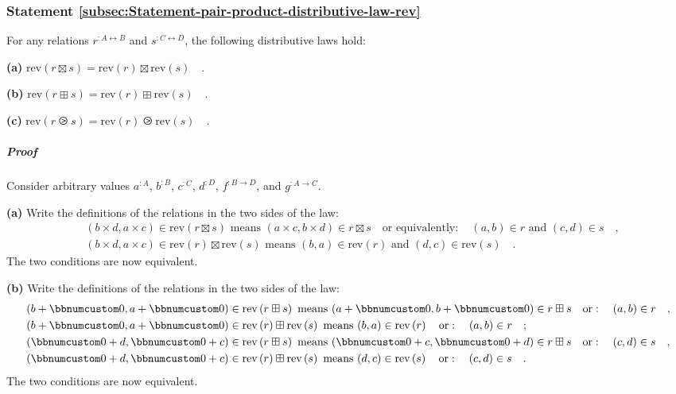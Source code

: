 \subsubsection{Statement \label{subsec:Statement-pair-product-distributive-law-rev}\ref{subsec:Statement-pair-product-distributive-law-rev}}

For any relations $r^{:A\leftrightarrow B}$ and $s^{:C\leftrightarrow D}$,
the following distributive laws hold:

\textbf{(a)} $\text{rev}\left(r\boxtimes s\right)=\text{rev}\left(r\right)\boxtimes\text{rev}\left(s\right)\quad$.

\textbf{(b)} $\text{rev}\left(r\boxplus s\right)=\text{rev}\left(r\right)\boxplus\text{rev}\left(s\right)\quad$.

\textbf{(c)} $\text{rev}\left(r\ogreaterthan s\right)=\text{rev}\left(r\right)\ogreaterthan\text{rev}\left(s\right)\quad$.

\subparagraph{Proof}

Consider arbitrary values $a^{:A}$, $b^{:B}$, $c^{:C}$, $d^{:D}$,
$f^{:B\rightarrow D}$, and $g^{:A\rightarrow C}$.

\textbf{(a)} Write the definitions of the relations in the two sides
of the law:
\begin{align*}
 & (b\times d,a\times c)\in\text{rev}\left(r\boxtimes s\right)\text{ means }(a\times c,b\times d)\in r\boxtimes s\quad\text{or equivalently}:\quad(a,b)\in r\text{ and }(c,d)\in s\quad,\\
 & (b\times d,a\times c)\in\text{rev}\left(r\right)\boxtimes\text{rev}\left(s\right)\text{ means }(b,a)\in\text{rev}\left(r\right)\text{ and }(d,c)\in\text{rev}\left(s\right)\quad.
\end{align*}
The two conditions are now equivalent.

\textbf{(b)} Write the definitions of the relations in the two sides
of the law:
\begin{align*}
 & (b+\bbnum 0,a+\bbnum 0)\in\text{rev}\left(r\boxplus s\right)\text{ means }(a+\bbnum 0,b+\bbnum 0)\in r\boxplus s\quad\text{or}:\quad(a,b)\in r\quad,\\
 & (b+\bbnum 0,a+\bbnum 0)\in\text{rev}\left(r\right)\boxplus\text{rev}\left(s\right)\text{ means }(b,a)\in\text{rev}\left(r\right)\quad\text{or}:\quad(a,b)\in r\quad;\\
 & (\bbnum 0+d,\bbnum 0+c)\in\text{rev}\left(r\boxplus s\right)\text{ means }(\bbnum 0+c,\bbnum 0+d)\in r\boxplus s\quad\text{or}:\quad(c,d)\in s\quad,\\
 & (\bbnum 0+d,\bbnum 0+c)\in\text{rev}\left(r\right)\boxplus\text{rev}\left(s\right)\text{ means }(d,c)\in\text{rev}\left(s\right)\quad\text{or}:\quad(c,d)\in s\quad.
\end{align*}
The two conditions are now equivalent.

